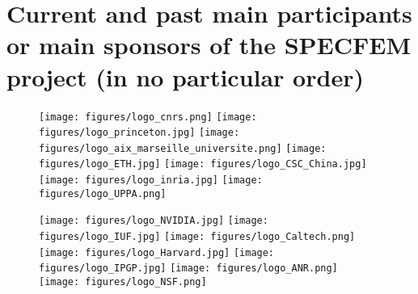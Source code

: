\section*{Current and past main participants or main sponsors of the SPECFEM project (in no particular order)}
%
\begin{figure}[htbp]
\noindent \begin{centering}
\texttt{[image: figures/logo\_cnrs.png]}\vspace*{2truemm}
\texttt{[image: figures/logo\_princeton.jpg]}\vspace*{2truemm}
\texttt{[image: figures/logo\_aix\_marseille\_universite.png]}\vspace*{0.02truemm}
\texttt{[image: figures/logo\_ETH.jpg]}\vspace*{2truemm}
\texttt{[image: figures/logo\_CSC\_China.jpg]}\vspace*{0.02truemm}
\texttt{[image: figures/logo\_inria.jpg]}\vspace*{2truemm}
\texttt{[image: figures/logo\_UPPA.png]}
\par\end{centering}
%
\vspace*{-2truemm}
%
\noindent \begin{centering}
\texttt{[image: figures/logo\_NVIDIA.jpg]}\vspace*{2truemm}
\texttt{[image: figures/logo\_IUF.jpg]}\vspace*{2truemm}
\texttt{[image: figures/logo\_Caltech.png]}\vspace*{2truemm}
\texttt{[image: figures/logo\_Harvard.jpg]}\vspace*{2truemm}
\texttt{[image: figures/logo\_IPGP.jpg]}\vspace*{2truemm}
\texttt{[image: figures/logo\_ANR.png]}\vspace*{2truemm}
\texttt{[image: figures/logo\_NSF.png]}\vspace*{2truemm}
\par\end{centering}
%
\vspace*{-2truemm}

\end{figure}
